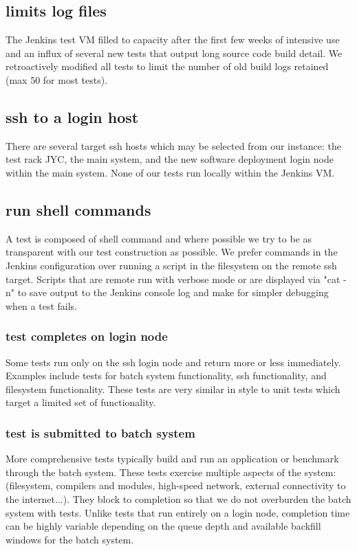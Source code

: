 \documentclass[10pt, conference, compsocconf]{IEEEtran}
\begin{document}
{\subsection{limits log files}
The Jenkins test VM filled to capacity after the first few weeks of intensive use and an influx of several new tests that output long source code build detail. 
 We retroactively modified all tests to limit the number of old build logs retained (max 50 for most tests). 

\subsection{ssh to a login host}
There are several target ssh hosts which may be selected from our instance: the test rack JYC, the main system, and the new software deployment login node within the main system. 
 None of our tests run locally within the Jenkins VM.
\subsection{run shell commands}
A test is composed of shell command and where possible we try to be as transparent with our test construction as possible. 
 We prefer commands in the Jenkins configuration over running a script in the filesystem on the remote ssh target. 
 Scripts that are remote run with verbose mode or are displayed via "cat -n" to save output to the Jenkins console log and make for simpler debugging when a test fails.
\subsubsection{test completes on login node}
Some tests run only on the ssh login node and return more or less immediately. 
 Examples include tests for batch system functionality, ssh functionality, and filesystem functionality. 
 These tests are very similar in style to unit tests which target a limited set of functionality.
\subsubsection{test is submitted to batch system}
More comprehensive tests typically build and run an application or benchmark through the batch system. 
 These tests exercise multiple aspects of the system: (filesystem, compilers and modules, high-speed network, external connectivity to the internet...). 
 They block to completion so that we do not overburden the batch system with tests. 
 Unlike tests that run entirely on a login node, completion time can be highly variable depending on the queue depth and available backfill windows for the batch system.
}
\end{document}
